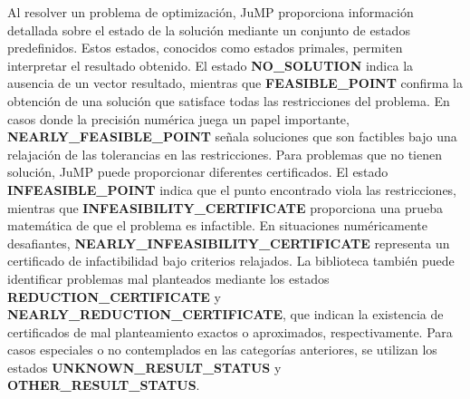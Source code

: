 Al resolver un problema de optimización, JuMP proporciona información detallada sobre el estado de la solución mediante un conjunto de estados predefinidos. Estos estados, conocidos como estados primales, permiten interpretar el resultado obtenido. El estado \textbf{NO\_SOLUTION} indica la ausencia de un vector resultado, mientras que \textbf{FEASIBLE\_POINT} confirma la obtención de una solución que satisface todas las restricciones del problema. En casos donde la precisión numérica juega un papel importante, \textbf{NEARLY\_FEASIBLE\_POINT} señala soluciones que son factibles bajo una relajación de las tolerancias en las restricciones. Para problemas que no tienen solución, JuMP puede proporcionar diferentes certificados. El estado \textbf{INFEASIBLE\_POINT} indica que el punto encontrado viola las restricciones, mientras que \textbf{INFEASIBILITY\_CERTIFICATE} proporciona una prueba matemática de que el problema es infactible. En situaciones numéricamente desafiantes, \textbf{NEARLY\_INFEASIBILITY\_CERTIFICATE} representa un certificado de infactibilidad bajo criterios relajados. La biblioteca también puede identificar problemas mal planteados mediante los estados \textbf{REDUCTION\_CERTIFICATE} y \textbf{NEARLY\_REDUCTION\_CERTIFICATE}, que indican la existencia de certificados de mal planteamiento exactos o aproximados, respectivamente. Para casos especiales o no contemplados en las categorías anteriores, se utilizan los estados \textbf{UNKNOWN\_RESULT\_STATUS} y \textbf{OTHER\_RESULT\_STATUS}.

